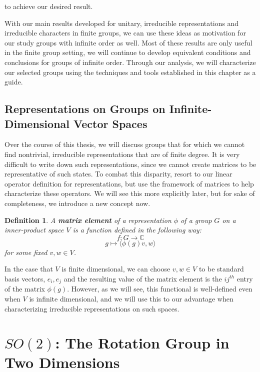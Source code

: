 \documentclass[10pt]{ucthesis}
\newcommand{\C}{\mathbb{C}}
\newtheorem{definition}{Definition}[chapter]
\begin{document}
to achieve our desired result. \cite{Tung} \qedsymbol


With our main results developed for unitary, irreducible representations and irreducible characters in finite groups, we can use these ideas as motivation for our study groups with infinite order as well. Most of these results are only useful in the finite group setting, we will continue to develop equivalent conditions and conclusions for groups of infinite order. Through our analysis, we will characterize our selected groups using the techniques and tools established in this chapter as a guide.

\section{Representations on Groups on Infinite-Dimensional Vector Spaces}

Over the course of this thesis, we will discuss groups that for which we cannot find nontrivial, irreducible representations that are of finite degree. It is very difficult to write down such representations, since we cannot create matrices to be representative of such states. To combat this disparity, resort to our linear operator definition for representations, but use the framework of matrices to help characterize these operators. We will see this more explicitly later, but for sake of completeness, we introduce a new concept now.

\begin{definition}
	A \textbf{matrix element} of a representation $\phi$ of a group $G$ on a inner-product space $V$ is a function defined in the following way:
$$f:G\rightarrow\C$$
$$g\mapsto\langle\phi(g)v,w\rangle$$
for some fixed $v,w\in V$.
\end{definition}

In the case that $V$ is finite dimensional, we can choose $v,w\in V$ to be standard basis vectors, $e_i,e_j$ and the resulting value of the matrix element is the $ij^{th}$ entry of the matrix $\phi(g)$. However, as we will see, this functional is well-defined even when $V$ is infinite dimensional, and we will use this to our advantage when characterizing irreducible representations on such spaces.

\chapter{$SO(2)$: The Rotation Group in Two Dimensions}
\end{document}
